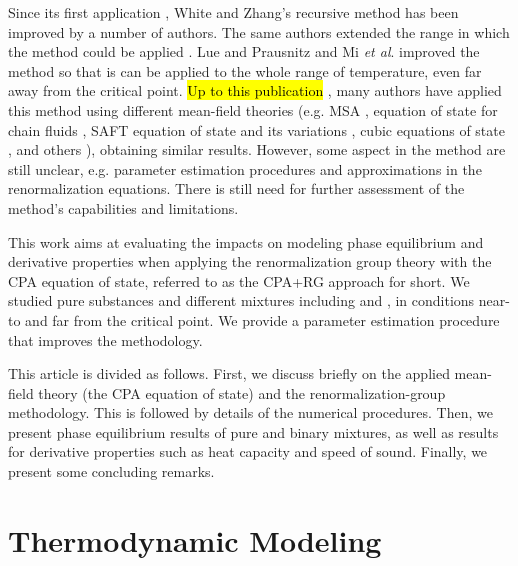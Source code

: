\documentclass[preprint,12pt,3p]{elsarticle}
\begin{document}
	Since its first application  \cite{white1993renormalization}, White and Zhang's recursive method has been improved by a number of authors. The same authors extended the range in which the method could be applied  \cite{white1998renormalization}. Lue and Prausnitz \cite{lue1998renormalization, lue1998brenormalization} and Mi \textit{et al}. \cite{mi2004improved} improved the method so that is can be applied to the whole range of temperature, even far away from the critical point. \hl{Up to this publication} , many authors have applied this method using different mean-field theories (e.g. MSA \cite{lue1998renormalization}, equation of state for chain fluids \cite{jiang1999equation, jiang2000phase}, SAFT equation of state and its variations \cite{llovell2004thermodynamic, forte2011application, bymaster2008renormalization, tang2010renormalization, llovell2006global, forte2013application, dias2009thermodynamic, llovell2006second, llovell2006prediction, llovell2007phase}, cubic equations of state  \cite{xu2011prediction, xu2010crossover, pcm2017application, llovell2008accurate, qiu2006vapor, cai2006vapor, cai2004thermodynamics}, and others \cite{ghobadi2013renormalization, choi2016renormalization}), obtaining similar results. However, some aspect in the method are still unclear, e.g. parameter estimation procedures and approximations in the renormalization equations. There is still need for further assessment of the method's capabilities and limitations.
	
	This work aims at evaluating the impacts on modeling phase equilibrium and derivative properties when applying the renormalization group theory with the CPA equation of state, referred to as the CPA+RG approach for short. We studied pure substances and different mixtures including  and , in conditions near-to and far from the critical point. We provide a parameter estimation procedure that improves the methodology.
	
	This article is divided as follows. First, we discuss briefly on the applied mean-field theory (the CPA equation of state) and the renormalization-group methodology. This is followed by details of the numerical procedures. Then, we present phase equilibrium results of pure and binary mixtures, as well as results for derivative properties such as heat capacity and speed of sound. Finally, we present some concluding remarks.

\section{Thermodynamic Modeling}
\end{document}
